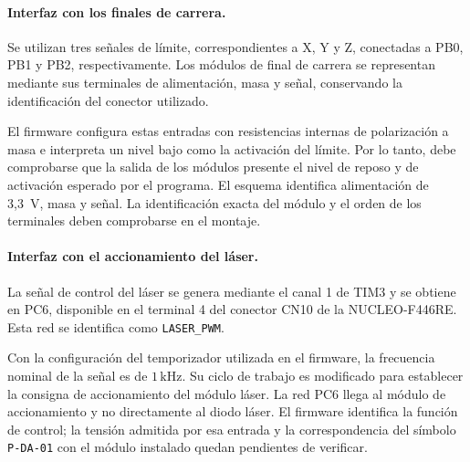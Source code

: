 \documentclass[blue,fullpaper]{ludusofficial}  %
\begin{document}
\paragraph{Interfaz con los finales de carrera.}
Se utilizan tres señales de límite, correspondientes
a X, Y y Z, conectadas a PB0, PB1 y PB2,
respectivamente. Los módulos de final de carrera
se representan mediante sus terminales de alimentación,
masa y señal, conservando la identificación
del conector utilizado.

El firmware configura estas entradas con resistencias
internas de polarización a masa e interpreta
un nivel bajo como la activación del límite.
Por lo tanto, debe comprobarse que la salida
de los módulos presente el nivel de reposo
y de activación esperado por el programa.
El esquema identifica alimentación de 3,3~V, masa y señal. La identificación exacta del módulo y el orden de los terminales deben comprobarse en el montaje.

\paragraph{Interfaz con el accionamiento del láser.}
La señal de control del láser se genera mediante
el canal 1 de TIM3 y se obtiene en PC6,
disponible en el terminal 4 del conector CN10
de la NUCLEO-F446RE. Esta red se identifica
como \texttt{LASER\_PWM}.

Con la configuración del temporizador utilizada
en el firmware, la frecuencia nominal de la señal
es de $1\,\mathrm{kHz}$. Su ciclo de trabajo
es modificado para establecer la consigna
de accionamiento del módulo láser.
La red PC6 llega al módulo de accionamiento y no directamente al diodo láser. El firmware identifica la función de control; la tensión admitida por esa entrada y la correspondencia del símbolo \texttt{P-DA-01} con el módulo instalado quedan pendientes de verificar.
\end{document}
